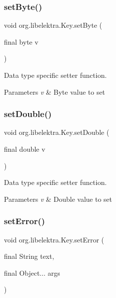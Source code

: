 \subsubsection{\texorpdfstring{set\+Byte()}{setByte()}}
{\footnotesize\ttfamily void org.\+libelektra.\+Key.\+set\+Byte (\begin{DoxyParamCaption}\item[{final byte}]{v }\end{DoxyParamCaption})\hspace{0.3cm}{\ttfamily [inline]}}



Data type specific setter function. 


\begin{DoxyParams}{Parameters}
{\em v} & Byte value to set \\
\hline
\end{DoxyParams}
\mbox{\label{classorg_1_1libelektra_1_1Key_a2c411133e9a8d13df30d08041678a5a0}} 
\subsubsection{\texorpdfstring{set\+Double()}{setDouble()}}
{\footnotesize\ttfamily void org.\+libelektra.\+Key.\+set\+Double (\begin{DoxyParamCaption}\item[{final double}]{v }\end{DoxyParamCaption})\hspace{0.3cm}{\ttfamily [inline]}}



Data type specific setter function. 


\begin{DoxyParams}{Parameters}
{\em v} & Double value to set \\
\hline
\end{DoxyParams}
\mbox{\label{classorg_1_1libelektra_1_1Key_a1f71503902725f238f81a1211eb5d9d5}} 
\subsubsection{\texorpdfstring{set\+Error()}{setError()}}
{\footnotesize\ttfamily void org.\+libelektra.\+Key.\+set\+Error (\begin{DoxyParamCaption}\item[{final String}]{text,  }\item[{final Object...}]{args }\end{DoxyParamCaption})\hspace{0.3cm}{\ttfamily [inline]}}



